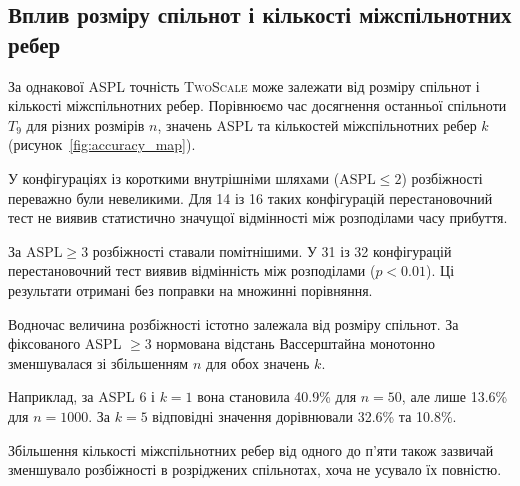 \documentclass[a4paper,fleqn]{cas-sc}
\newcommand{\TS}{\textup{\textsc{TwoScale}}}
\begin{document}
\subsection{Вплив розміру спільнот
і кількості міжспільнотних ребер}
\label{sec:res_size}

За однакової ASPL точність \TS{}
може залежати від розміру спільнот
і кількості міжспільнотних ребер.
Порівнюємо час досягнення останньої спільноти
$T_9$ для різних розмірів $n$,
значень ASPL та кількостей
міжспільнотних ребер $k$
(рисунок~\ref{fig:accuracy_map}).

У конфігураціях із короткими
внутрішніми шляхами
($\mathrm{ASPL}\leq2$)
розбіжності переважно були невеликими.
Для 14 із 16 таких конфігурацій
перестановочний тест не виявив
статистично значущої відмінності
між розподілами часу прибуття.

За $\mathrm{ASPL}\geq3$
розбіжності ставали помітнішими.
У 31 із 32 конфігурацій
перестановочний тест виявив
відмінність між розподілами
($p<0.01$). Ці результати
отримані без поправки
на множинні порівняння.

Водночас величина розбіжності
істотно залежала від розміру
спільнот. За фіксованого
ASPL $\geq3$ нормована
відстань Вассерштайна
монотонно зменшувалася
зі збільшенням $n$
для обох значень $k$.

Наприклад, за ASPL 6 і $k=1$
вона становила 40.9\%
для $n=50$, але лише 13.6\%
для $n=1000$.
За $k=5$ відповідні значення
дорівнювали 32.6\% та 10.8\%.

Збільшення кількості
міжспільнотних ребер від одного
до п'яти також зазвичай
зменшувало розбіжності
в розріджених спільнотах,
хоча не усувало їх повністю.
\end{document}
